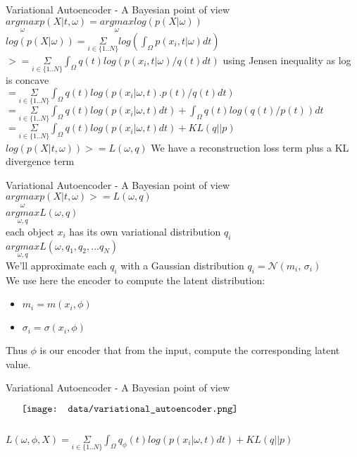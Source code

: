 \documentclass{beamer}
\begin{document}
\begin{frame}{Variational Autoencoder - A Bayesian point of view}
	$\underset{\omega}{argmax} p(X|t, \omega) = \underset{\omega}{argmax} log(p(X| \omega))$ \\
	$ log(p(X| \omega)) = \underset{i \in \{1..N\}}{\Sigma} log( \int_\Omega p(x_i, t | \omega) dt)$ \\ 
	$ >= \underset{i \in \{1..N\}}{\Sigma} \int_\Omega q(t) log( p(x_i, t | \omega)/q(t) dt)$ using Jensen inequality as log is concave\\
	$ = \underset{i \in \{1..N\}}{\Sigma} \int_\Omega q(t) log( p(x_i | \omega, t).p(t)/q(t) dt)$ \\
	$ = \underset{i \in \{1..N\}}{\Sigma} \int_\Omega q(t) log( p(x_i | \omega, t) dt) + \int_\Omega q(t)log(q(t)/p(t)) dt$ \\
	$ = \underset{i \in \{1..N\}}{\Sigma} \int_\Omega q(t) log( p(x_i | \omega, t) dt) + KL( q || p) $ \\
	$ log(p(X|t, \omega)) >= L(\omega,q) $
	We have a reconstruction loss term plus a KL divergence term
\end{frame}

\begin{frame}{Variational Autoencoder - A Bayesian point of view}
	$ \underset{\omega}{argmax} p(X|t, \omega) >= L(\omega,q) $ \\
        $ \underset{\omega,q}{argmax} L(\omega,q) $ \\
	each object $x_i$ has its own variational distribution $q_i$ \\
        $ \underset{\omega,q}{argmax} L(\omega,q_1, q_2, ... q_N) $ \\
	We'll approximate each $q_i$ with a Gaussian distribution $q_i = \mathcal{N}(m_i,\,\sigma_i)$ \\
	We use here the encoder to compute the latent distribution: \\
	\begin{itemize}
		\item $m_i = m(x_i, \phi)$
		\item $\sigma_i = \sigma(x_i, \phi)$
	\end{itemize}
	Thus $\phi$ is our encoder that from the input, compute the corresponding latent value.
\end{frame}

\begin{frame}{Variational Autoencoder - A Bayesian point of view}
    \begin{minipage}{5in}
    \centering
    $\vcenter{
    \texttt{[image: data/variational\_autoencoder.png]} \\
    }$
    \end{minipage}
    $ L(\omega, \phi, X)= \underset{i \in \{1..N\}}{\Sigma} \int_\Omega q_\phi(t) log( p(x_i | \omega, t) dt) + KL( q || p ) $
\end{frame}
\end{document}
